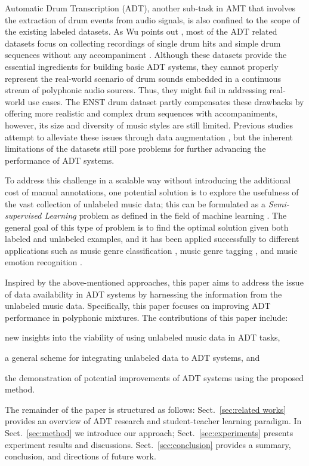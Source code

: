 \documentclass{article}
\begin{document}
Automatic Drum Transcription (ADT), another sub-task in AMT that involves the extraction of drum events from audio signals, is also confined to the scope of the existing labeled datasets. As Wu points out \cite{Wu2016}, most of the ADT related datasets focus on collecting recordings of single drum hits \cite{Tindale2004, Prockup2013} and simple drum sequences without any accompaniment \cite{Dittmar2014}. Although these datasets provide the essential ingredients for building basic ADT systems, they cannot properly represent the real-world scenario of drum sounds embedded in a continuous stream of polyphonic audio sources. Thus, they might fail in addressing real-world use cases. The ENST drum dataset \cite{Gillet2006} partly compensates these drawbacks by offering more realistic and complex drum sequences with accompaniments, however, its size and diversity of music styles are still limited. Previous studies attempt to alleviate these issues through data augmentation \cite{Wu2016, Vogl2017}, but the inherent limitations of the datasets still pose problems for further advancing the performance of ADT systems. 

To address this challenge in a scalable way without introducing the additional cost of manual annotations, one potential solution is to explore the usefulness of the vast collection of unlabeled music data; this can be formulated as a \textit{Semi-supervised Learning} problem as defined in the field of machine learning \cite{Chapelle2006}. The general goal of this type of problem is to find the optimal solution given both labeled and unlabeled examples, and it has been applied successfully to different applications such as music genre classification \cite{Raina2007a}, music genre tagging \cite{Jao2015}, and music emotion recognition \cite{Wu2013a}.

Inspired by the above-mentioned approaches, this paper aims to address the issue of data availability in ADT systems by harnessing the information from the unlabeled music data. Specifically, this paper focuses on improving ADT performance in polyphonic mixtures. The contributions of this paper include: 
\begin{inparaenum}[(i)]
	\item   new insights into the viability of using unlabeled music data in ADT tasks, 
    \item   a general scheme for integrating unlabeled data to ADT systems, and 
    \item   the demonstration of potential improvements of ADT systems using the proposed method.
\end{inparaenum} 
The remainder of the paper is structured as follows: Sect.~\ref{sec:related works} provides an overview of ADT research and student-teacher learning paradigm. In Sect.~\ref{sec:method} we introduce our approach; Sect.~\ref{sec:experiments} presents experiment results and discussions. Sect.~\ref{sec:conclusion} provides a summary, conclusion, and directions of future work.
\end{document}
